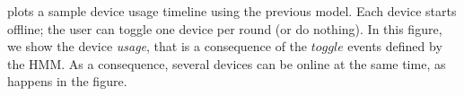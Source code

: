  plots a sample device usage timeline using the previous model. 
Each device starts offline; the user can toggle one device per round (or do nothing).
In this figure, we show the device \emph{usage}, that is a consequence of the $\mathit{toggle}$ events defined by the HMM.
As a consequence, several devices can be online at the same time, as happens in the figure.





